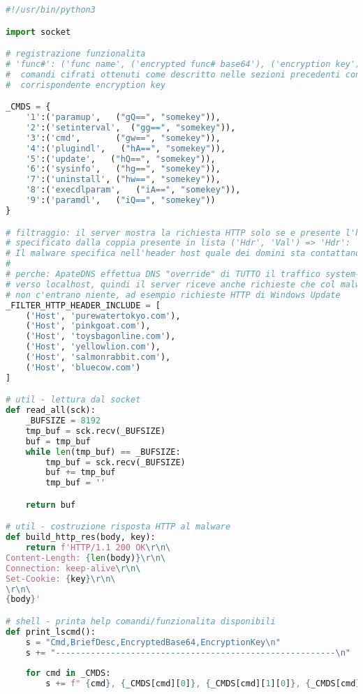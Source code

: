 \documentclass[
    a4paper, %
    11pt %
]{article}
\begin{document}
            \begin{lstlisting}[language=Python]
#!/usr/bin/python3

import socket

# registrazione funzionalita
# 'func#': ('func name', ('encrypted func# base64'), ('encryption key'))
#  comandi cifrati ottenuti come descritto nelle sezioni precedenti con la loro
#  corrispondente encryption key

_CMDS = {
    '1':('paramup',   ("gQ==", "somekey")),
    '2':('setinterval',  ("gg==", "somekey")),
    '3':('cmd',       ("gw==", "somekey")),
    '4':('plugindl',   ("hA==", "somekey")),
    '5':('update',   ("hQ==", "somekey")),
    '6':('sysinfo',   ("hg==", "somekey")),
    '7':('uninstall', ("hw==", "somekey")),
    '8':('execdlparam',   ("iA==", "somekey")),
    '9':('paramdl',   ("iQ==", "somekey"))
}

# filtraggio: il server mostra la richiesta HTTP solo se e presente l'header
# specificato dalla coppia presente in lista ('Hdr', 'Val') => 'Hdr': 'Val'
# Il malware specifica nell'header host quale dei domini sta contattando.
#
# perche: ApateDNS effettua DNS "override" di TUTTO il traffico system-wide
# verso localhost, quindi il server riceve anche richieste che col malware 
# non c'entrano niente, ad esempio richieste HTTP di Windows Update
_FILTER_HTTP_HEADER_INCLUDE = [
    ('Host', 'purewatertokyo.com'),
    ('Host', 'pinkgoat.com'),
    ('Host', 'toysbagonline.com'),
    ('Host', 'yellowlion.com'),
    ('Host', 'salmonrabbit.com'),
    ('Host', 'bluecow.com')
]

# util - lettura dal socket
def read_all(sck):
    _BUFSIZE = 8192
    tmp_buf = sck.recv(_BUFSIZE)
    buf = tmp_buf
    while len(tmp_buf) == _BUFSIZE:
        tmp_buf = sck.recv(_BUFSIZE)
        buf += tmp_buf
        tmp_buf = ''

    return buf

# util - costruzione risposta HTTP al malware
def build_http_res(body, key):
    return f'HTTP/1.1 200 OK\r\n\
Content-Length: {len(body)}\r\n\
Connection: keep-alive\r\n\
Set-Cookie: {key}\r\n\
\r\n\
{body}'

# shell - printa help comandi/funzionalita disponibili
def print_lscmd():
    s = "Cmd,BriefDesc,EncryptedBase64,EncryptionKey\n"
    s += "--------------------------------------------------------\n"
    
    for cmd in _CMDS:
        s += f" {cmd}, {_CMDS[cmd][0]}, {_CMDS[cmd][1][0]}, {_CMDS[cmd][1][1]}\n"
 

\end{lstlisting}
\end{document}
